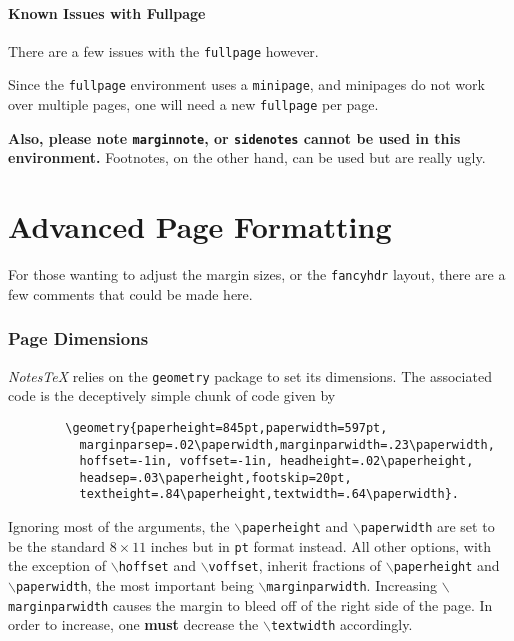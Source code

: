 \documentclass[10pt]{article}
\begin{document}
	\subsection{Known Issues with Fullpage}\label{Sub: Fullpage_Issues}

	There are a few issues with the \texttt{fullpage} however. 
	\begin{remark}
		Since the \texttt{fullpage} environment uses a \texttt{minipage}, and minipages do not work over multiple pages, one will need a new \texttt{fullpage} per page.	
	\end{remark}
	\begin{remark}
		\textbf{Also, please note \texttt{marginnote}, or \texttt{sidenotes} cannot be used in this environment.} Footnotes, on the other hand, can be used but are really ugly.
	\end{remark}
	
	\newpage

	\part{Advanced Page Formatting}
	For those wanting to adjust the margin sizes, or the \texttt{fancyhdr} layout, there are a few comments that could be made here.
	\section{Page Dimensions}
	\textit{NotesTeX} relies on the \texttt{geometry} package to set its dimensions. The associated code is the deceptively simple chunk of code given by
	\begin{verbatim}
		\geometry{paperheight=845pt,paperwidth=597pt,
          marginparsep=.02\paperwidth,marginparwidth=.23\paperwidth,
          hoffset=-1in, voffset=-1in, headheight=.02\paperheight,
          headsep=.03\paperheight,footskip=20pt,
          textheight=.84\paperheight,textwidth=.64\paperwidth}.
	\end{verbatim}
	Ignoring most of the arguments, the \texttt{$\backslash$paperheight} and \texttt{$\backslash$paperwidth} are set to be the standard $8\times11$ inches but in \texttt{pt} format instead. All other options, with the exception of \texttt{$\backslash$hoffset} and \texttt{$\backslash$voffset}, inherit fractions of \texttt{$\backslash$paperheight} and \texttt{$\backslash$paperwidth}, the most important being \texttt{$\backslash$marginparwidth}. Increasing \texttt{$\backslash$marginparwidth} causes the margin to bleed off of the right side of the page. In order to increase, one \textbf{must} decrease the \texttt{$\backslash$textwidth} accordingly.
\end{document}
